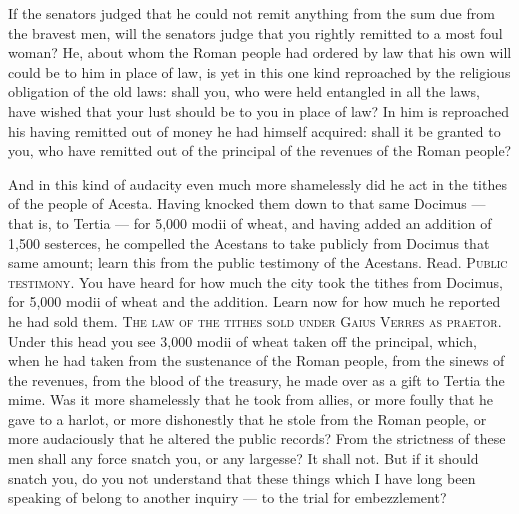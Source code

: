  If the senators judged that he could not remit anything from the sum due from the bravest men, will the senators judge that you rightly remitted to a most foul woman? He, about whom the Roman people had ordered by law that his own will could be to him in place of law, is yet in this one kind reproached by the religious obligation of the old laws: shall you, who were held entangled in all the laws, have wished that your lust should be to you in place of law? In him is reproached his having remitted out of money he had himself acquired: shall it be granted to you, who have remitted out of the principal of the revenues of the Roman people?

 And in this kind of audacity even much more shamelessly did he act in the tithes of the people of Acesta. Having knocked them down to that same Docimus --- that is, to Tertia --- for 5,000 modii of wheat, and having added an addition of 1,500 sesterces, he compelled the Acestans to take publicly from Docimus that same amount; learn this from the public testimony of the Acestans. Read. \textsc{Public testimony}. You have heard for how much the city took the tithes from Docimus, for 5,000 modii of wheat and the addition. Learn now for how much he reported he had sold them. \textsc{The law of the tithes sold under Gaius Verres as praetor}. Under this head you see 3,000 modii of wheat taken off the principal, which, when he had taken from the sustenance of the Roman people, from the sinews of the revenues, from the blood of the treasury, he made over as a gift to Tertia the mime. Was it more shamelessly that he took from allies, or more foully that he gave to a harlot, or more dishonestly that he stole from the Roman people, or more audaciously that he altered the public records? From the strictness of these men shall any force snatch you, or any largesse? It shall not. But if it should snatch you, do you not understand that these things which I have long been speaking of belong to another inquiry --- to the trial for embezzlement?

